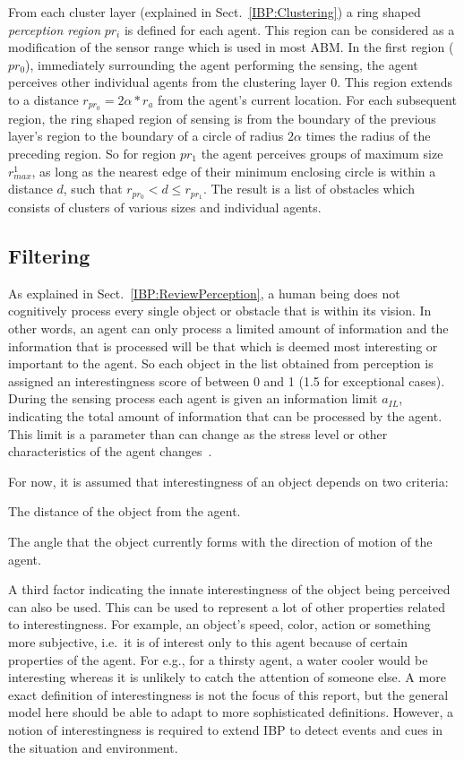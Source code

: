 From each cluster layer (explained in Sect.~\ref{IBP:Clustering}) a ring shaped {\em perception region} $pr_i$ is defined for each agent. This region can be considered as a modification of the sensor range which is used in most ABM.  In the first region ($pr_0$), immediately surrounding the agent performing the sensing, the agent perceives other individual agents from the clustering layer 0. This region extends to a distance $r_{pr_0} = 2\alpha *r_{a}$ from the agent's current location. For each subsequent region, the ring shaped region of sensing is from the boundary of the previous layer's region to the boundary of a circle of radius $2\alpha$ times the radius of the preceding region. So for region $pr_1$ the agent perceives groups of maximum size $r^{1}_{max}$, as long as the nearest edge of their minimum enclosing circle is within a distance $d$, such that $ r_{pr_0} < d \leq r_{pr_1}$. The result is a list of obstacles which consists of clusters of various sizes and individual agents.

\subsection{Filtering}
\label{IBP:Filtering}

As explained in Sect.~\ref{IBP:ReviewPerception}, a human being does not cognitively process every single object or obstacle that is within its vision. In other words, an agent can only process a limited amount of information and the information that is processed will be that which is deemed most interesting or important to the agent. So each object in the list obtained from perception is assigned an interestingness score of between 0 and 1 (1.5 for exceptional cases). During the sensing process each agent is given an information limit $a_{IL}$, indicating the total amount of information that can be processed by the agent. This limit is a parameter than can change as the stress level or other characteristics of the agent changes~\cite{Ozel:2001tn}.

For now, it is assumed that interestingness of an object depends on two criteria:
\begin{inparaenum}
\item The distance of the object from the agent.
\item The angle that the object currently forms with the direction of motion of the agent.
\end{inparaenum}
A third factor indicating the innate interestingness of the object being perceived can also be used. This can be used to represent a lot of other properties related to interestingness. For example, an object's speed, color, action or something more subjective, i.e.\ it is of interest only to this agent because of certain properties of the agent. For e.g., for a thirsty agent, a water cooler would be interesting whereas it is unlikely to catch the attention of someone else. A more exact definition of interestingness is not the focus of this report, but the general model here should be able to adapt to more sophisticated definitions. However, a notion of interestingness is required to extend IBP to detect events and cues in the situation and environment.

